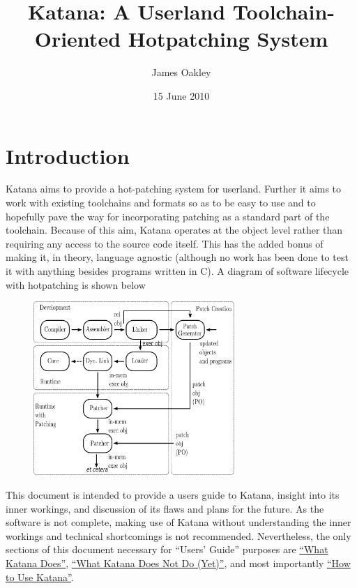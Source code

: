 \documentclass[11pt]{article}
\title{Katana: A Userland Toolchain-Oriented Hotpatching System}
\author{James Oakley}
\date{15 June 2010}
\begin{document}
\maketitle

\setcounter{tocdepth}{3}
\tableofcontents
\vspace*{1cm}


\section{Introduction}
\label{sec-1}

  Katana aims to provide a hot-patching system for userland. Further
  it aims to work with existing toolchains and formats so as to be
  easy to use and to hopefully pave the way for incorporating patching
  as a standard part of the toolchain. Because of this aim, Katana
  operates at the object level rather than requiring any access to the
  source code itself. This has the added bonus of making it, in
  theory, language agnostic (although no work has been done to test it
  with anything besides programs written in C). A diagram of software
  lifecycle with hotpatching is shown below


\begin{figure}[h!]
\includegraphics[width=3in]{./softwarelifecycle.pdf}
\end{figure}


  This document is intended to provide a users guide to Katana,
  insight into its inner workings, and discussion of its flaws and
  plans for the future. As the software is not complete, making use of
  Katana without understanding the inner workings and technical
  shortcomings is not recommended. Nevertheless, the only sections of
  this document necessary for ``Users' Guide'' purposes are 
  \hyperref[sec-3]{``What Katana Does''}, \hyperref[sec-4]{``What Katana Does Not Do (Yet)''}, and most importantly 
  \hyperref[sec-6]{``How to Use Katana''}.
 
\end{document}

